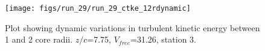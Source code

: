 \begin{figure}[H]
\centering
\texttt{[image: figs/run\_29/run\_29\_ctke\_12rdynamic]}
\caption{Plot showing dynamic variations in turbulent kinetic energy between 1 and 2 core radii. $z/c$=7.75, $V_{free}$=31.26, station 3.}
\label{fig:run_29_ctke_12rdynamic}
\end{figure}


